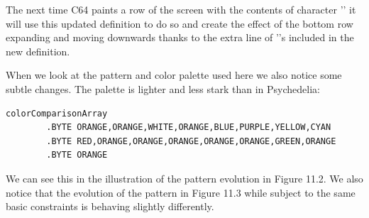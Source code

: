 The next time C64 paints a row of the screen with the contents of character '' it will use this updated definition to do so and create the 
effect of the bottom row expanding and moving downwards thanks to the extra line of ''s included in the new definition.

When we look at the pattern and color palette used here we also notice some subtle changes. The palette is lighter and less stark than in
Psychedelia:

\begin{lstlisting}[escapechar=\%]
colorComparisonArray   
        .BYTE ORANGE,ORANGE,WHITE,ORANGE,BLUE,PURPLE,YELLOW,CYAN
        .BYTE RED,ORANGE,ORANGE,ORANGE,ORANGE,ORANGE,GREEN,ORANGE
        .BYTE ORANGE
\end{lstlisting}

We can see this in the illustration of the pattern evolution in Figure 11.2. We also notice that the evolution of the pattern in Figure 11.3 while
subject to the same basic constraints is behaving slightly differently.

